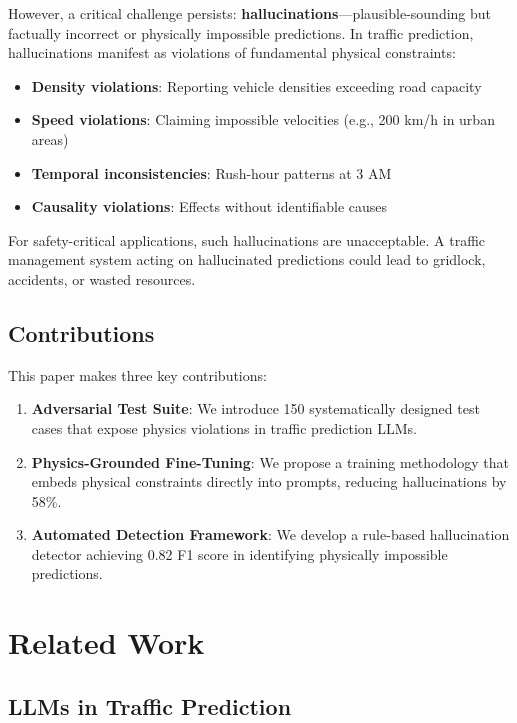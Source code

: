 \documentclass[conference]{IEEEtran}
\begin{document}
However, a critical challenge persists: \textbf{hallucinations}—plausible-sounding but factually incorrect or physically impossible predictions. In traffic prediction, hallucinations manifest as violations of fundamental physical constraints:

\begin{itemize}
    \item \textbf{Density violations}: Reporting vehicle densities exceeding road capacity
    \item \textbf{Speed violations}: Claiming impossible velocities (e.g., 200 km/h in urban areas)
    \item \textbf{Temporal inconsistencies}: Rush-hour patterns at 3 AM
    \item \textbf{Causality violations}: Effects without identifiable causes
\end{itemize}

For safety-critical applications, such hallucinations are unacceptable. A traffic management system acting on hallucinated predictions could lead to gridlock, accidents, or wasted resources.

\subsection{Contributions}

This paper makes three key contributions:

\begin{enumerate}
    \item \textbf{Adversarial Test Suite}: We introduce 150 systematically designed test cases that expose physics violations in traffic prediction LLMs.
    
    \item \textbf{Physics-Grounded Fine-Tuning}: We propose a training methodology that embeds physical constraints directly into prompts, reducing hallucinations by 58\%.
    
    \item \textbf{Automated Detection Framework}: We develop a rule-based hallucination detector achieving 0.82 F1 score in identifying physically impossible predictions.
\end{enumerate}

\section{Related Work}

\subsection{LLMs in Traffic Prediction}
\end{document}
